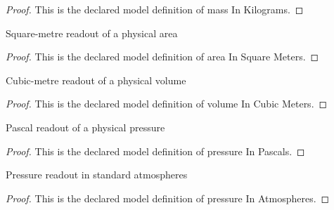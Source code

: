 \begin{proof}
  This is the declared model definition of mass In Kilograms.
\end{proof}
\begin{definition}
  \label{def:physics:phyx-mini-0374:phyxminiproblems-problemphyxmini0374-areainsquaremeters}
  Square-metre readout of a physical area
\end{definition}
\begin{proof}
  This is the declared model definition of area In Square Meters.
\end{proof}
\begin{definition}
  \label{def:physics:phyx-mini-0374:phyxminiproblems-problemphyxmini0374-volumeincubicmeters}
  Cubic-metre readout of a physical volume
\end{definition}
\begin{proof}
  This is the declared model definition of volume In Cubic Meters.
\end{proof}
\begin{definition}
  \label{def:physics:phyx-mini-0374:phyxminiproblems-problemphyxmini0374-pressureinpascals}
  Pascal readout of a physical pressure
\end{definition}
\begin{proof}
  This is the declared model definition of pressure In Pascals.
\end{proof}
\begin{definition}
  \label{def:physics:phyx-mini-0374:phyxminiproblems-problemphyxmini0374-pressureinatmospheres}
  Pressure readout in standard atmospheres
\end{definition}
\begin{proof}
  This is the declared model definition of pressure In Atmospheres.
\end{proof}
